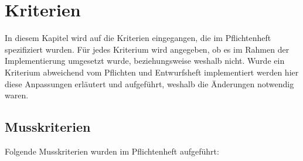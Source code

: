 
\chapter{Kriterien}
\label{chap:kriterien}

In diesem Kapitel wird auf die Kriterien eingegangen, die im Pflichtenheft spezifiziert wurden.
Für jedes Kriterium wird angegeben, ob es im Rahmen der Implementierung umgesetzt wurde, beziehungsweise weshalb nicht.
Wurde ein Kriterium abweichend vom Pflichten und Entwurfsheft implementiert werden hier diese Anpassungen erläutert und aufgeführt, weshalb die Änderungen notwendig waren.

\section{Musskriterien}\label{sec:musskriterien}

Folgende Musskriterien wurden im Pflichtenheft aufgeführt:

